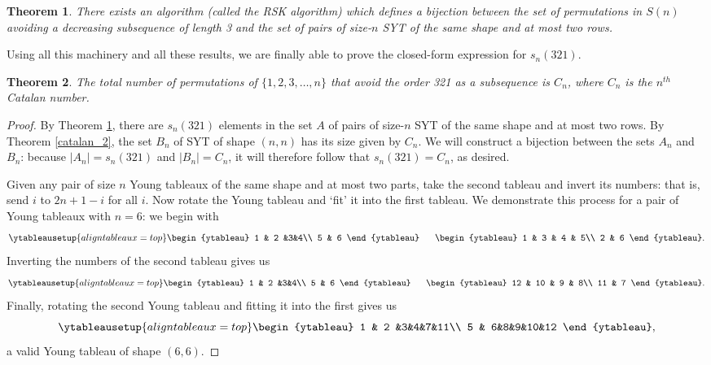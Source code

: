 \documentclass[11pt,letterpaper,twoside,english]{article}
\theoremstyle{theorem}
\newtheorem{theorem}{Theorem}
\theoremstyle{remark}
\begin{document}
\begin{theorem}
\label{rsk}
There exists an algorithm (called the \emph{RSK algorithm}) which defines a bijection between the set of permutations in $S(n)$ avoiding a decreasing subsequence of length 3 and the set of pairs of size-$n$ SYT of the same shape and at most two rows. 
\end{theorem}
Using all this machinery and all these results, we are finally able to prove the closed-form expression for $s_n(321)$.
\begin{theorem}
The total number of permutations of $\{1,2,3,\ldots, n\}$ that avoid the order 321 as a subsequence is $C_n$, where $C_n$ is the $n^{th}$ Catalan number.
\end{theorem}
\begin{proof}
By Theorem \ref{rsk}, there are $s_n(321)$ elements in the set $A$ of pairs of size-$n$ SYT of the same shape and at most two rows. By Theorem \ref{catalan_2}, the set $B_n$ of SYT of shape $(n, n)$ has its size given by $C_n$. We will construct a bijection between the sets $A_n$ and $B_n$: because $|A_n|=s_n(321)$ and $|B_n|=C_n$, it will therefore follow that $s_n(321)=C_n$, as desired.

Given any pair of size $n$ Young tableaux of the same shape and at most two parts, take the second tableau and invert its numbers: that is, send $i$ to $2n+1-i$ for all $i$. Now rotate the Young tableau and `fit' it into the first tableau. We demonstrate this process for a pair of Young tableaux with $n=6$: we begin with
\[\ytableausetup{aligntableaux=top}
\begin{ytableau}
1 & 2 &3&4\\
5 & 6
\end{ytableau} \ \ \ \ \ 
\hfill
\begin{ytableau}
1 & 3 & 4 & 5\\
2 & 6
\end{ytableau}.\]
Inverting the numbers of the second tableau gives us
\[\ytableausetup{aligntableaux=top}
\begin{ytableau}
1 & 2 &3&4\\
5 & 6
\end{ytableau} \ \ \ \ \ 
\hfill
\begin{ytableau}
12 & 10 & 9 & 8\\
11 & 7
\end{ytableau}.\]
Finally, rotating the second Young tableau and fitting it into the first gives us
\[\ytableausetup{aligntableaux=top}
\begin{ytableau}
1 & 2 &3&4&7&11\\
5 & 6&8&9&10&12
\end{ytableau},\]
a valid Young tableau of shape $(6, 6)$. 


\end{proof}
\end{document}
